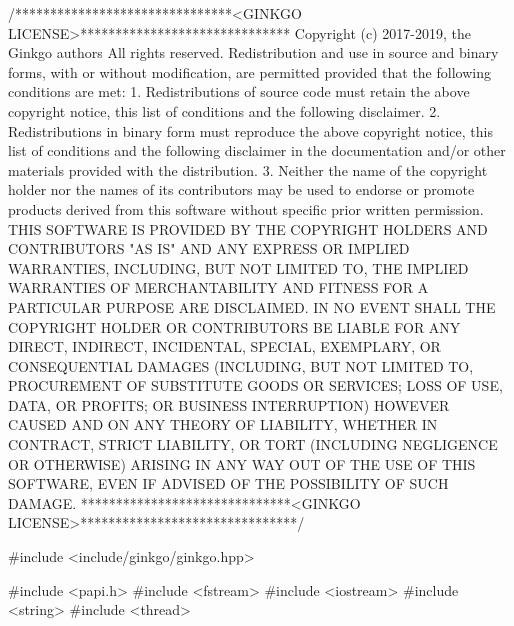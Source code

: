 \begin{DoxyCodeInclude}
\textcolor{comment}{/*******************************<GINKGO LICENSE>******************************}
\textcolor{comment}{Copyright (c) 2017-2019, the Ginkgo authors}
\textcolor{comment}{All rights reserved.}
\textcolor{comment}{}
\textcolor{comment}{Redistribution and use in source and binary forms, with or without}
\textcolor{comment}{modification, are permitted provided that the following conditions}
\textcolor{comment}{are met:}
\textcolor{comment}{}
\textcolor{comment}{1. Redistributions of source code must retain the above copyright}
\textcolor{comment}{notice, this list of conditions and the following disclaimer.}
\textcolor{comment}{}
\textcolor{comment}{2. Redistributions in binary form must reproduce the above copyright}
\textcolor{comment}{notice, this list of conditions and the following disclaimer in the}
\textcolor{comment}{documentation and/or other materials provided with the distribution.}
\textcolor{comment}{}
\textcolor{comment}{3. Neither the name of the copyright holder nor the names of its}
\textcolor{comment}{contributors may be used to endorse or promote products derived from}
\textcolor{comment}{this software without specific prior written permission.}
\textcolor{comment}{}
\textcolor{comment}{THIS SOFTWARE IS PROVIDED BY THE COPYRIGHT HOLDERS AND CONTRIBUTORS "AS}
\textcolor{comment}{IS" AND ANY EXPRESS OR IMPLIED WARRANTIES, INCLUDING, BUT NOT LIMITED}
\textcolor{comment}{TO, THE IMPLIED WARRANTIES OF MERCHANTABILITY AND FITNESS FOR A}
\textcolor{comment}{PARTICULAR PURPOSE ARE DISCLAIMED. IN NO EVENT SHALL THE COPYRIGHT}
\textcolor{comment}{HOLDER OR CONTRIBUTORS BE LIABLE FOR ANY DIRECT, INDIRECT, INCIDENTAL,}
\textcolor{comment}{SPECIAL, EXEMPLARY, OR CONSEQUENTIAL DAMAGES (INCLUDING, BUT NOT}
\textcolor{comment}{LIMITED TO, PROCUREMENT OF SUBSTITUTE GOODS OR SERVICES; LOSS OF USE,}
\textcolor{comment}{DATA, OR PROFITS; OR BUSINESS INTERRUPTION) HOWEVER CAUSED AND ON ANY}
\textcolor{comment}{THEORY OF LIABILITY, WHETHER IN CONTRACT, STRICT LIABILITY, OR TORT}
\textcolor{comment}{(INCLUDING NEGLIGENCE OR OTHERWISE) ARISING IN ANY WAY OUT OF THE USE}
\textcolor{comment}{OF THIS SOFTWARE, EVEN IF ADVISED OF THE POSSIBILITY OF SUCH DAMAGE.}
\textcolor{comment}{******************************<GINKGO LICENSE>*******************************/}

\textcolor{preprocessor}{#include <include/ginkgo/ginkgo.hpp>}


\textcolor{preprocessor}{#include <papi.h>}
\textcolor{preprocessor}{#include <fstream>}
\textcolor{preprocessor}{#include <iostream>}
\textcolor{preprocessor}{#include <string>}
\textcolor{preprocessor}{#include <thread>}



\end{DoxyCodeInclude}
